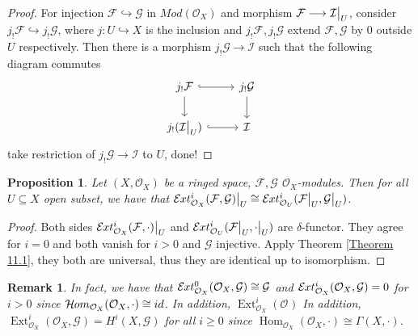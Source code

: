 \documentclass{ctexart}
\newtheorem{remark}{Remark}[section]
\newtheorem{proposition}{Proposition}[section]
\renewcommand{\hom}{\operatorname{Hom}}
\newcommand{\ext}{\operatorname{Ext}}
\newcommand{\sheafhom}{\mathcal{H}\kern -.5pt om}
\newcommand{\sheafext}{\mathcal{E}\kern -.5pt xt}
\begin{document}
\begin{proof}
    For injection $\mathcal{F} \hookrightarrow \mathcal{G}$ in $Mod(\mathcal{O}_{X})$ and morphism $\mathcal{F} \longrightarrow \mathcal{I}\big{|}_{U}$, consider $j_{!}\mathcal{F} \hookrightarrow j_{!}\mathcal{G}$,
    where $j: U \hookrightarrow X$ is the inclusion and $j_{!}\mathcal{F}, j_{!}\mathcal{G}$ extend $\mathcal{F}, \mathcal{G}$ by $0$ outside $U$ respectively.
    Then there is a morphism $j_{!}\mathcal{G} \longrightarrow \mathcal{I}$ such that the following diagram commutes
    \begin{equation*}
        \begin{tikzcd}
            j_{!}\mathcal{F} \arrow[r, hookrightarrow] \arrow[d] &
            j_{!}\mathcal{G} \arrow[d] \\
            j_{!}(\mathcal{I}\big{|}_{U}) \arrow[r, hookrightarrow] &
            \mathcal{I}
        \end{tikzcd}
    \end{equation*} 
    take restriction of $j_{!}\mathcal{G} \longrightarrow \mathcal{I}$ to $U$, done!
\end{proof}
\begin{proposition}
    Let $(X, \mathcal{O}_{X})$ be a ringed space, $\mathcal{F}, \mathcal{G}$ $\mathcal{O}_{X}$-modules.
    Then for all $U \subseteq X$ open subset, we have that $\sheafext_{\mathcal{O}_{X}}^{i}(\mathcal{F}, \mathcal{G})\big{|}_{U} \cong \sheafext_{\mathcal{O}_{U}}^{i}(\mathcal{F}\big{|}_{U}, \mathcal{G}\big{|}_{U})$.
    \label{Proposition 11.1}
\end{proposition}
\begin{proof}
    Both sides $\sheafext_{\mathcal{O}_{X}}^{i}(\mathcal{F}, \cdot)\big{|}_{U}$ and $\sheafext_{\mathcal{O}_{U}}^{i}(\mathcal{F}\big{|}_{U}, \cdot\big{|}_{U})$ are $\delta$-functor.
    They agree for $i = 0$ and both vanish for $i > 0$ and $\mathcal{G}$ injective.
    Apply Theorem \ref{Theorem 11.1}, they both are universal, thus they are identical up to isomorphism.
\end{proof}
\begin{remark}
    In fact, we have that $\sheafext_{\mathcal{O}_{X}}^{0}(\mathcal{O}_{X}, \mathcal{G}) \cong \mathcal{G}$ and $\sheafext_{\mathcal{O}_{X}}^{i}(\mathcal{O}_{X}, \mathcal{G}) = 0$ for $i > 0$ since $\sheafhom_{\mathcal{O}_{X}}(\mathcal{O}_{X}, \cdot) \cong id$.
    In addition, $\ext_{\mathcal{O}_{X}}^{i}(\mathcal{O}_{})$
    In addition, $\ext_{\mathcal{O}_{X}}^{i}(\mathcal{O}_{X}, \mathcal{G}) = H^{i}(X, \mathcal{G})$ for all $i \ge 0$ since $\hom_{\mathcal{O}_{X}}(\mathcal{O}_{X}, \cdot) \cong \Gamma(X, \cdot)$.
\end{remark}
\end{document}
